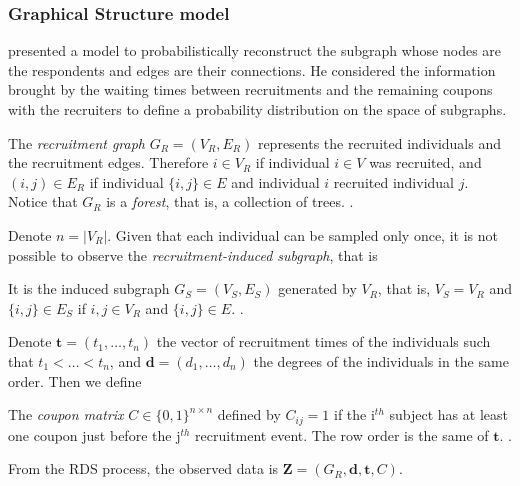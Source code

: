 \subsubsection{Graphical Structure model}

\textcite{crawford2016} presented a model to probabilistically reconstruct the
subgraph whose nodes are the respondents and edges are their connections. He
considered the information brought by the waiting times between recruitments
and the remaining coupons with the recruiters to define a probability
distribution on the space of subgraphs. 

\begin{definition}
  The {\em recruitment graph} $G_R = (V_R, E_R)$ represents the recruited
  individuals and the recruitment edges. Therefore $i \in V_R$ if individual
  $i \in V$ was recruited, and $(i,j) \in E_R$ if individual $\{i,j\} \in E$ 
  and individual $i$ recruited individual $j$. Notice that $G_R$ is a {\em
  forest}, that is, a collection of trees. \cite[p. 193]{crawford2016}.
\end{definition}

Denote $n = |V_R|$. Given that each individual can be sampled only once, it is not possible to
observe the {\em recruitment-induced subgraph}, that is

\begin{definition}
  It is the induced subgraph $G_S = (V_S, E_S)$ generated by $V_R$, that is,
  $V_S = V_R$ and $\{i,j\} \in E_S$ if $i, j \in V_R$ and $\{i, j\} \in E$. 
  \cite[p. 192]{crawford2016}.
\end{definition}

Denote $\boldsymbol{t} = (t_1, \dots, t_n)$ the vector of recruitment times of
the individuals such that $t_1 < \dots < t_n$, and $\boldsymbol{d} = (d_1,
\dots, d_n)$ the degrees of the individuals in the same order. Then we define 

\begin{definition}
  The {\em coupon matrix} $C \in \{0,1\}^{n\times n}$ defined by $C_{ij} =
1$ if the i$^{th}$ subject has at least one coupon just before the j$^{th}$
recruitment event. The row order is the same of $\boldsymbol{t}$. \cite[p.
193]{crawford2016}. 
\end{definition}

From the RDS process, the observed data is $\boldsymbol{Z} = (G_R,
\boldsymbol{d}, \boldsymbol{t}, C)$. 


